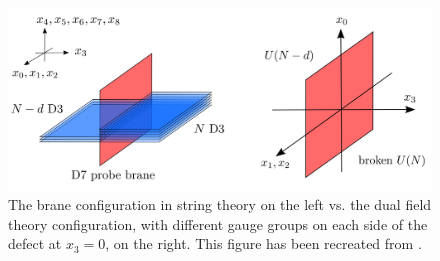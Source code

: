 \begin{figure}
%
\begin{center}
%
\includegraphics[width=1.0\textwidth]{../pics/brane_vs_field_setup_new.png}
%
\caption[Brane configuration vs. field theory configuration]{The brane configuration in string theory on the left vs. the dual field theory configuration, with different gauge groups on each side of the defect at $x_3=0$, on the right. This figure has been recreated from \cite{One-point functions in D3-D7}.}
%
\label{fig:probe-brane-setup}
%
\end{center}
%
\end{figure}
%
%

